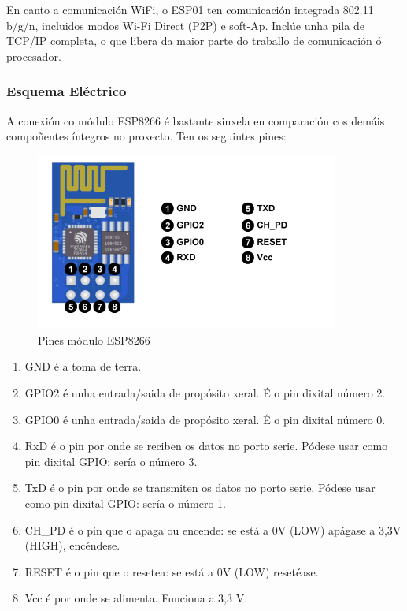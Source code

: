 \documentclass[11pt,twoside]{book}
\begin{document}
En canto a comunicación WiFi, o ESP01 ten comunicación integrada 802.11  b/g/n, incluidos modos  Wi-Fi  Direct (P2P) e  soft-Ap. Inclúe unha pila de  TCP/IP completa, o que libera da maior parte do traballo de comunicación ó procesador.

\subsubsection{Esquema Eléctrico}

A conexión co módulo ESP8266 é bastante sinxela en comparación cos demáis compoñentes íntegros no proxecto. Ten os seguintes pines:

\begin{figure}[H]
	\begin{center}
		\includegraphics[width=10cm]{images/pines-esp01.png}
	\end{center}
	\caption{Pines módulo ESP8266}
	\label{fig:PinesESP8266}
\end{figure}

\begin{enumerate}
\item GND é a toma de terra.
\item GPIO2 é unha entrada/saida de propósito xeral. É o pin dixital número 2.
\item GPIO0 é unha entrada/saida de propósito xeral. É o pin dixital número 0.
\item RxD é o pin por onde se reciben os datos no porto serie. Pódese usar como pin dixital GPIO: sería o número 3.
\item TxD é o pin por onde se transmiten os datos no porto serie. Pódese usar como pin dixital GPIO: sería o número 1.
\item CH\_PD é o pin que o apaga ou encende: se está a 0V (LOW) apágase a 3,3V (HIGH), encéndese.
\item RESET é o pin que o resetea: se está a 0V (LOW) resetéase.
\item Vcc é por onde se alimenta. Funciona a 3,3 V.
\end{enumerate}
\end{document}
